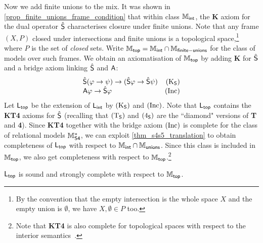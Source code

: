 Now we add finite unions to the mix. It was shown in
\cref{prop_finite_unions_frame_condition} that within class $\Mint$, the
\textbf{K} axiom for the dual operator $\hat\S$ characterises closure under
finite unions. Note that any frame $(X, P)$ closed under intersections and
finite unions is a topological space,\footnote{By the convention that the empty
intersection is the whole space $X$ and the empty union is $\emptyset$, we have
$X, \emptyset \in P$ too.} where $P$ is the set of \emph{closed} sets. Write
$\Mtop = \Mint \cap \Mfunions$ for the class of models over such frames. We
obtain an axiomatisation of $\Mtop$ by adding \textbf{K} for $\hat\S$ and a
bridge axiom linking $\hat\S$ and $\A$:
\[
    \begin{array}{lr}
        \hat{\S}(\phi \limplies \psi) \limplies (\hat{\S}\phi \limplies \hat{\S}\psi)
            & \Ksoundness \\
        \A\phi \limplies \hat\S\phi
    & \inc
    \end{array}
\]
Let $\sLtop$ be the extension
of $\sLint$ by $\Ksoundness$ and $\inc$. Note that $\sLtop$ contains the
\textbf{KT4} axioms for $\hat\S$ (recalling that $\Tsoundness$ and
$\foursoundness$ are the ``diamond" versions of \textbf{T} and \textbf{4}).
Since \textbf{KT4} together with the bridge axiom $\inc$ is complete for the
class of relational models $\Msfour$, we can exploit
\cref{thm_s4s5_translation} to obtain completeness of $\sLtop$ with respect to
$\Mint \cap \Munions$. Since this class is included in $\Mtop$, we also get
completeness with respect to $\Mtop$.\footnote{Note that \textbf{KT4} is also
complete for topological spaces with respect to the interior
semantics~\citep{van2007modal}.}

\begin{theorem}
\label{thm_mtop_axiomatisation}
    $\sLtop$ is sound and strongly complete with respect to $\Mtop$.
\end{theorem}

